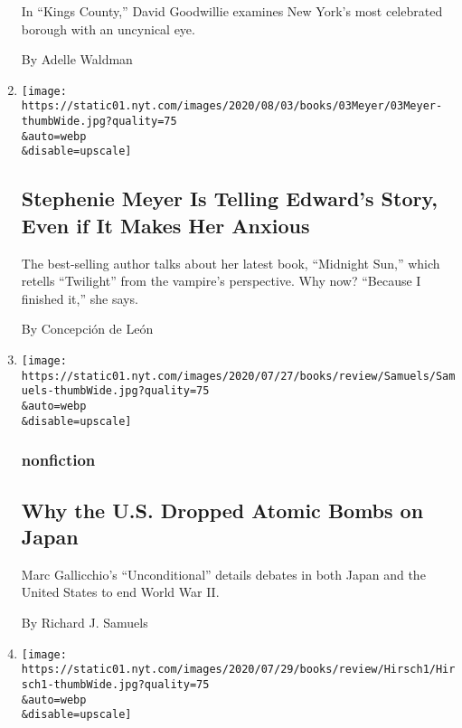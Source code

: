 \begin{enumerate}
  In ``Kings County,'' David Goodwillie examines New York's most
  celebrated borough with an uncynical eye.

  By Adelle Waldman
\item
  \href{/2020/08/03/books/midnight-sun-stephenie-meyer-twilight.html}{}

  \texttt{[image: https://static01.nyt.com/images/2020/08/03/books/03Meyer/03Meyer-thumbWide.jpg?quality=75\\\&auto=webp\\\&disable=upscale]}

  \hypertarget{stephenie-meyer-is-telling-edwards-story-even-if-it-makes-her-anxious}{%
  \subsection{Stephenie Meyer Is Telling Edward's Story, Even if It
  Makes Her
  Anxious}\label{stephenie-meyer-is-telling-edwards-story-even-if-it-makes-her-anxious}}

  The best-selling author talks about her latest book, ``Midnight Sun,''
  which retells ``Twilight'' from the vampire's perspective. Why now?
  ``Because I finished it,'' she says.

  By Concepción de León
\item
  \href{/2020/08/03/books/review/unconditional-marc-gallicchio.html}{}

  \texttt{[image: https://static01.nyt.com/images/2020/07/27/books/review/Samuels/Samuels-thumbWide.jpg?quality=75\\\&auto=webp\\\&disable=upscale]}

  \hypertarget{nonfiction}{%
  \subsubsection{nonfiction}\label{nonfiction}}

  \hypertarget{why-the-us-dropped-atomic-bombs-on-japan}{%
  \subsection{Why the U.S. Dropped Atomic Bombs on
  Japan}\label{why-the-us-dropped-atomic-bombs-on-japan}}

  Marc Gallicchio's ``Unconditional'' details debates in both Japan and
  the United States to end World War II.

  By Richard J. Samuels
\item
  \href{/2020/08/03/books/review/wandering-in-strange-lands-morgan-jerkins.html}{}

  \texttt{[image: https://static01.nyt.com/images/2020/07/29/books/review/Hirsch1/Hirsch1-thumbWide.jpg?quality=75\\\&auto=webp\\\&disable=upscale]}


\end{enumerate}
